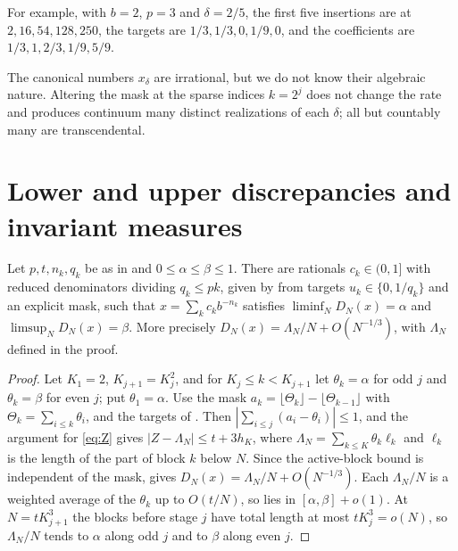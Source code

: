 \documentclass[11pt]{article}
\begin{document}
For example, with $b=2$, $p=3$ and $\delta=2/5$, the first five insertions are at
$2,16,54,128,250$, the targets are $1/3,1/3,0,1/9,0$, and the coefficients are
$1/3,1,2/3,1/9,5/9$.

\begin{remark}
The canonical numbers $x_\delta$ are irrational, but we do not know their algebraic nature. Altering
the mask at the sparse indices $k=2^j$ does not change the rate and produces continuum many
distinct realizations of each $\delta$; all but countably many are transcendental.
\end{remark}

\section{Lower and upper discrepancies and invariant measures}\label{sec:limitsets}

\begin{theorem}\label{thm:pairs}
Let $p,t,n_k,q_k$ be as in  and $0\le\alpha\le\beta\le1$. There are rationals
$c_k\in(0,1]$ with reduced denominators dividing $q_k\le pk$, given by  from targets
$u_k\in\{0,1/q_k\}$ and an explicit mask, such that $x=\sum_kc_kb^{-n_k}$ satisfies
$\liminf_ND_N(x)=\alpha$ and $\limsup_ND_N(x)=\beta$. More precisely $D_N(x)=\Lambda_N/N+O(N^{-1/3})$,
with $\Lambda_N$ defined in the proof.
\end{theorem}

\begin{proof}
Let $K_1=2$, $K_{j+1}=K_j^2$, and for $K_j\le k<K_{j+1}$ let $\theta_k=\alpha$ for odd $j$ and
$\theta_k=\beta$ for even $j$; put $\theta_1=\alpha$. Use the mask
$a_k=\lfloor\Theta_k\rfloor-\lfloor\Theta_{k-1}\rfloor$ with $\Theta_k=\sum_{i\le k}\theta_i$, and the
targets of . Then $|\sum_{i\le j}(a_i-\theta_i)|\le1$, and the argument for
\eqref{eq:Z} gives $|Z-\Lambda_N|\le t+3h_K$, where $\Lambda_N=\sum_{k\le K}\theta_k\ell_k$ and $\ell_k$
is the length of the part of block $k$ below $N$. Since the active-block bound is independent of
the mask,  gives $D_N(x)=\Lambda_N/N+O(N^{-1/3})$. Each $\Lambda_N/N$ is a weighted
average of the $\theta_k$ up to $O(t/N)$, so lies in $[\alpha,\beta]+o(1)$. At $N=tK_{j+1}^3$ the
blocks before stage $j$ have total length at most $tK_j^3=o(N)$, so $\Lambda_N/N$ tends to $\alpha$ along
odd $j$ and to $\beta$ along even $j$.
\end{proof}
\end{document}
